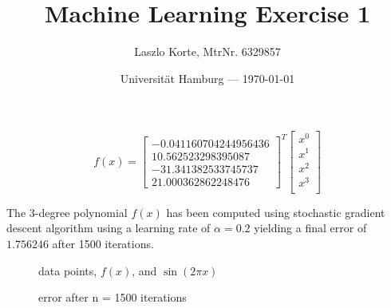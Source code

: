 \documentclass[parskip=half,a4paper]{scrartcl}
\title{Machine Learning Exercise 1}
\author{Laszlo Korte, MtrNr. 6329857}
\date{Universität Hamburg --- \today}
\begin{document}
\maketitle


$$
f(x) = \begin{bmatrix}
-0.041160704244956436 \\
10.562523298395087 \\
-31.341382533745737  \\
21.000362862248476
\end{bmatrix}^T
\begin{bmatrix}
x^0 \\
x^1 \\
x^2 \\
x^3 \\
\end{bmatrix}
$$


The 3-degree polynomial $f(x)$ has been computed using stochastic gradient descent algorithm using a learning rate of $\alpha = 0.2$ yielding a final error of $1.756246$ after 1500 iterations.

\begin{figure}[H]
\begin{center}
\scalebox{.7}{}
\caption{data points, $f(x)$, and $\sin(2\pi x)$}
\end{center}
\end{figure}

\begin{figure}[H]
\begin{center}
\scalebox{.7}{}
\caption{error after n = 1500 iterations}
\end{center}
\end{figure}
\end{document}
